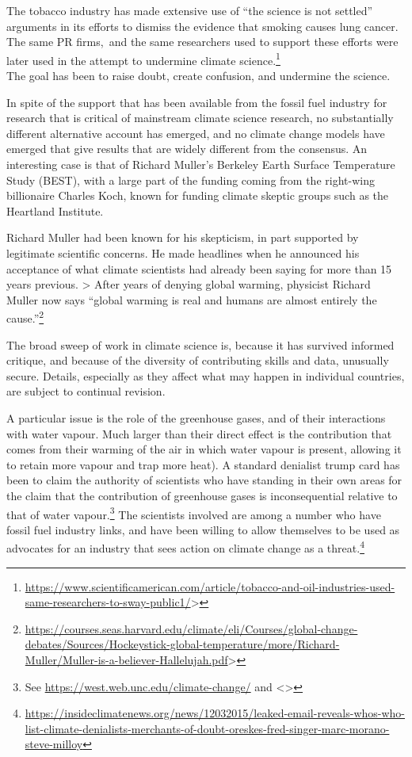 \documentclass[
  10pt,
  b5paper]{book}
\begin{document}
The tobacco industry has made extensive use of ``the science is not settled''
arguments in its efforts to dismiss the evidence that smoking causes lung cancer.
The same PR firms,~and the same researchers used to support these efforts
were later used in the attempt to undermine climate science.\footnote{\url{https://www.scientificamerican.com/article/tobacco-and-oil-industries-used-same-researchers-to-sway-public1/}\textgreater{}}\\
The goal has been to raise doubt, create confusion, and undermine the
science.

In spite of the support that has been available from the fossil fuel
industry for research that is critical of mainstream climate science
research, no substantially different alternative account has emerged,
and no climate change models have emerged that give results that are
widely different from the consensus. An interesting case is that of
Richard Muller's Berkeley Earth Surface Temperature Study (BEST),
with a large part of the funding coming from the right-wing billionaire
Charles Koch, known for funding climate skeptic groups such as the
Heartland Institute.

Richard Muller had been known for his skepticism, in part supported
by legitimate scientific concerns. He made headlines when he announced
his acceptance of what climate scientists had already been saying
for more than 15 years previous.
\textgreater{} After years of denying global warming, physicist Richard Muller now says ``global warming is real and humans are almost entirely the cause.''\footnote{\url{https://courses.seas.harvard.edu/climate/eli/Courses/global-change-debates/Sources/Hockeystick-global-temperature/more/Richard-Muller/Muller-is-a-believer-Hallelujah.pdf}\textgreater{}}

The broad sweep of work in climate science is, because it has survived
informed critique, and because of the diversity of contributing skills
and data, unusually secure. Details, especially as they affect what may
happen in individual countries, are subject to continual revision.

A particular issue is the role of the greenhouse gases, and of their
interactions with water vapour. Much larger than their direct effect
is the contribution that comes from their warming of the air in which
water vapour is present, allowing it to retain more vapour and trap
more heat). A standard denialist trump card has been to claim the
authority of scientists who have standing in their own areas for the
claim that the contribution of greenhouse gases is inconsequential
relative to that of water
vapour.\footnote{See \url{https://west.web.unc.edu/climate-change/} and
  \textless\textgreater{}}
The scientists involved are among a number who have fossil fuel
industry links, and have been willing to allow themselves to be
used as advocates for an industry that sees action on climate
change as a threat.\footnote{\url{https://insideclimatenews.org/news/12032015/leaked-email-reveals-whos-who-list-climate-denialists-merchants-of-doubt-oreskes-fred-singer-marc-morano-steve-milloy}}
\end{document}
